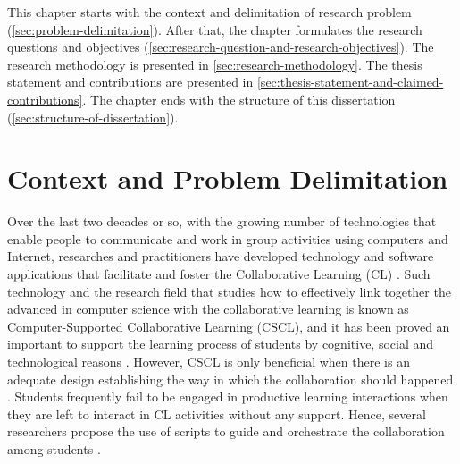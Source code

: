 
This chapter starts with the context and delimitation of research problem (\autoref{sec:problem-delimitation}). After that, the chapter formulates the research questions and objectives (\autoref{sec:research-question-and-research-objectives}). The research methodology is presented in \autoref{sec:research-methodology}. The thesis statement and contributions are presented in \autoref{sec:thesis-statement-and-claimed-contributions}. The chapter ends with the structure of this dissertation (\autoref{sec:structure-of-dissertation}).

\section{Context and Problem Delimitation}
\label{sec:problem-delimitation}

Over the last two decades or so, with the growing number of technologies that enable people to communicate and work in group activities using computers and Internet, researches and practitioners have developed technology and software applications that facilitate and foster the Collaborative Learning (CL) \cite{LehtinenHakkarainenLipponenRahikainenMuukkonen1999}. Such technology and the research field that studies how to effectively link together the advanced in computer science with the collaborative learning is known as Computer-Supported Collaborative Learning (CSCL), and it has been proved an important to support the learning process of students by cognitive, social and technological reasons \cite{StahlKoschmannSuthers2006}. However, CSCL is only beneficial when there is an adequate design establishing the way in which the collaboration should happened \cite{Dillenbourg2013, Hewitt2005, IsotaniInabaIkedaMizoguchi2009}. Students frequently fail to be engaged in productive learning interactions when they are left to interact in CL activities without any support. Hence, several researchers propose the use of scripts to guide and orchestrate the collaboration among students \cite{AlharbiAthaudaChiong2014}.

